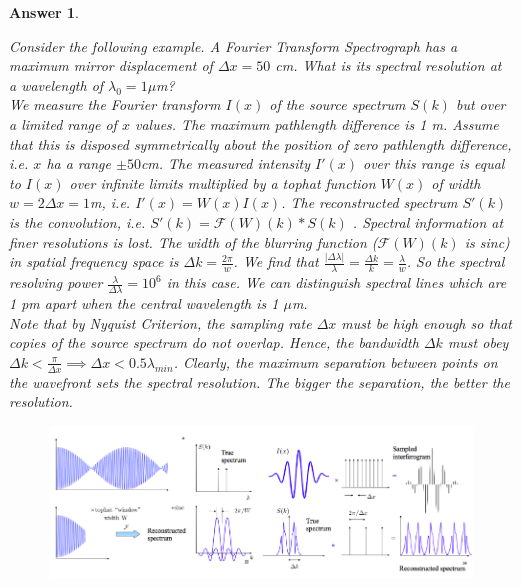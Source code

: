 \documentclass[a4paper]{article}
\newtheorem{ans}{Answer}[subsection]
\theoremstyle{new}
\begin{document}
\begin{ans}
\begin{figure}[H]
\end{figure}
Consider the following example. A Fourier Transform Spectrograph has a maximum mirror displacement of $\Delta x=50$ cm. What is its spectral resolution at a wavelength of $\lambda_0=1\mu$m?\\[5pt]
We measure the Fourier transform $I(x)$ of the source spectrum $S(k)$ but over a limited range of $x$ values. The maximum pathlength difference is 1 m. Assume that this is disposed symmetrically about the position of zero pathlength difference, i.e. $x$ ha a range $\pm50$cm. The measured intensity $I'(x)$ over this range is equal to $I(x)$ over infinite limits multiplied by a tophat function $W(x)$ of width $w=2\Delta x=1$m, i.e. $I'(x)=W(x)I(x)$. The reconstructed spectrum $S'(k)$ is the convolution, i.e. $S'(k)=\mathcal{F}(W)(k)*S(k)$ . Spectral information at finer resolutions is lost. The width of the blurring function ($\mathcal{F}(W)(k)$ is sinc) in spatial frequency space is $\Delta k=\frac{2\pi}{w}$. We find that $\frac{|\Delta\lambda|}{\lambda}=\frac{\Delta k}{k}=\frac{\lambda}{w}$. So the spectral resolving power $\frac{\lambda}{\Delta\lambda}=10^6$ in this case. We can distinguish spectral lines which are 1 pm apart when the central wavelength is 1 $\mu$m.\\[5pt]
Note that by Nyquist Criterion, the sampling rate $\Delta x$ must be high enough so that copies of the source spectrum do not overlap. Hence, the bandwidth $\Delta k$ must obey $\Delta k<\frac{\pi}{\Delta x}\implies\Delta x<0.5\lambda_{min}$. Clearly, the maximum separation between points on the wavefront sets the spectral resolution. The bigger the separation, the better the resolution.
\begin{figure}[H]
    \centering
    \includegraphics[width=\linewidth]{FTS.PNG}
\end{figure}

\end{ans}
\end{document}
